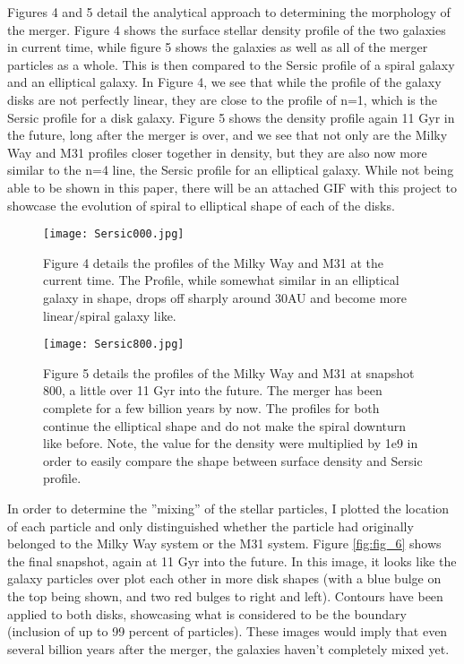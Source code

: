 \documentclass{aastex63}
\begin{document}
\medskip

Figures 4 and 5 detail the analytical approach to determining the morphology of the merger. Figure 4 shows the surface stellar density profile of the two galaxies in current time, while figure 5 shows the galaxies as well as all of the merger particles as a whole. This is then compared to the Sersic profile of a spiral galaxy and an elliptical galaxy. In Figure 4, we see that while the profile of the galaxy disks are not perfectly linear, they are close to the profile of n=1, which is the Sersic profile for a disk galaxy. Figure 5 shows the density profile again 11 Gyr in the future, long after the merger is over, and we see that not only are the Milky Way and M31 profiles closer together in density, but they are also now more similar to the n=4 line, the Sersic profile for an elliptical galaxy. While not being able to be shown in this paper, there will be an attached GIF with this project to showcase the evolution of spiral to elliptical shape of each of the disks.  

 \begin{figure}
    \centering
    \texttt{[image: Sersic000.jpg]}
    \caption{Figure 4 details the profiles of the Milky Way and M31 at the current time. The Profile, while somewhat similar in an elliptical galaxy in shape, drops off sharply around 30AU and become more linear/spiral galaxy like.}
    \label{fig:fig_4}
\end{figure}

\begin{figure}
    \centering
    \texttt{[image: Sersic800.jpg]}
    \caption{Figure 5 details the profiles of the Milky Way and M31 at snapshot 800, a little over 11 Gyr into the future. The merger has been complete for a few billion years by now. The profiles for both continue the elliptical shape and do not make the spiral downturn like before. Note, the value for the density were multiplied by 1e9 in order to easily compare the shape between surface density and Sersic profile. }
    \label{fig:fig_5}
\end{figure}

\medskip

In order to determine the ''mixing'' of the stellar particles, I plotted the location of each particle and only distinguished whether the particle had originally belonged to the Milky Way system or the M31 system. Figure \ref{fig:fig_6} shows the final snapshot, again at 11 Gyr into the future. In this image, it looks like the galaxy particles over plot each other in more disk shapes (with a blue bulge on the top being shown, and two red bulges to right and left). Contours have been applied to both disks, showcasing what is considered to be the boundary (inclusion of up to 99 percent of particles). These images would imply that even several billion years after the merger, the galaxies haven't completely mixed yet. 
\end{document}
